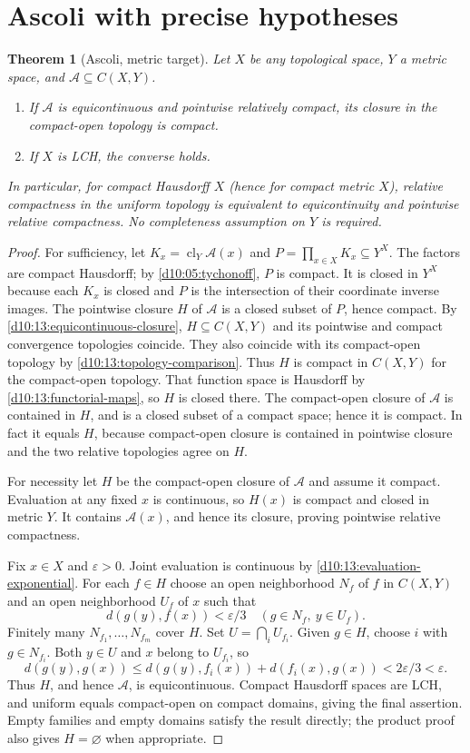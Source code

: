 \documentclass[11pt,oneside,openany]{book}
\newtheorem{theorem}{Theorem}[chapter]
\theoremstyle{definition}
\theoremstyle{remark}
\newcommand{\eps}{\varepsilon}
\DeclareMathOperator{\cl}{cl}
\begin{document}
\section{Ascoli with precise hypotheses}

\begin{theorem}[Ascoli, metric target]\label{d10:13:ascoli}
Let $X$ be any topological space, $Y$ a metric space, and $\mathcal A\subseteq C(X,Y)$.
\begin{enumerate}[label=(\alph*)]
\item If $\mathcal A$ is equicontinuous and pointwise relatively compact, its closure in the compact-open topology is compact.
\item If $X$ is LCH, the converse holds.
\end{enumerate}
In particular, for compact Hausdorff $X$ (hence for compact metric $X$), relative compactness in the uniform topology is equivalent to equicontinuity and pointwise relative compactness. No completeness assumption on $Y$ is required.
\end{theorem}
\begin{proof}
For sufficiency, let $K_x=\cl_Y\mathcal A(x)$ and $P=\prod_{x\in X}K_x\subseteq Y^X$. The factors are compact Hausdorff; by \cref{d10:05:tychonoff}, $P$ is compact. It is closed in $Y^X$ because each $K_x$ is closed and $P$ is the intersection of their coordinate inverse images. The pointwise closure $H$ of $\mathcal A$ is a closed subset of $P$, hence compact. By \cref{d10:13:equicontinuous-closure}, $H\subseteq C(X,Y)$ and its pointwise and compact convergence topologies coincide. They also coincide with its compact-open topology by \cref{d10:13:topology-comparison}. Thus $H$ is compact in $C(X,Y)$ for the compact-open topology. That function space is Hausdorff by \cref{d10:13:functorial-maps}, so $H$ is closed there. The compact-open closure of $\mathcal A$ is contained in $H$, and is a closed subset of a compact space; hence it is compact. In fact it equals $H$, because compact-open closure is contained in pointwise closure and the two relative topologies agree on $H$.

For necessity let $H$ be the compact-open closure of $\mathcal A$ and assume it compact. Evaluation at any fixed $x$ is continuous, so $H(x)$ is compact and closed in metric $Y$. It contains $\mathcal A(x)$, and hence its closure, proving pointwise relative compactness.

Fix $x\in X$ and $\eps>0$. Joint evaluation is continuous by \cref{d10:13:evaluation-exponential}. For each $f\in H$ choose an open neighborhood $N_f$ of $f$ in $C(X,Y)$ and an open neighborhood $U_f$ of $x$ such that
\[
 d(g(y),f(x))<\eps/3\quad(g\in N_f,\ y\in U_f).
\]
Finitely many $N_{f_1},\ldots,N_{f_m}$ cover $H$. Set $U=\bigcap_iU_{f_i}$. Given $g\in H$, choose $i$ with $g\in N_{f_i}$. Both $y\in U$ and $x$ belong to $U_{f_i}$, so
\[
 d(g(y),g(x))\leq d(g(y),f_i(x))+d(f_i(x),g(x))<2\eps/3<\eps.
\]
Thus $H$, and hence $\mathcal A$, is equicontinuous. Compact Hausdorff spaces are LCH, and uniform equals compact-open on compact domains, giving the final assertion. Empty families and empty domains satisfy the result directly; the product proof also gives $H=\varnothing$ when appropriate.
\end{proof}
\end{document}
